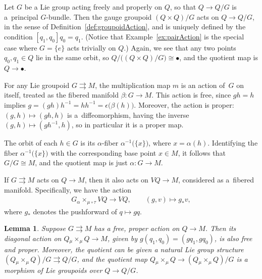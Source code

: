 \documentclass[10pt,a4paper]{amsart}
\numberwithin{equation}{section}
\newtheorem{Lemma}[Theorem]{Lemma}
\begin{document}
\begin{Example} Let $G$ be a Lie group acting freely and properly on $Q$, so that $ Q \rightarrow Q / G $ is a~principal $G$-bundle. Then the gauge groupoid $ ( Q \times Q ) / G $ acts on $ Q \rightarrow Q / G $, in the sense of Def\/inition~\ref{def:groupoidAction}, and is uniquely def\/ined by the condition $ [q _1, q _0 ] q _0 = q _1 $. (Notice that Example~\ref{ex:pairAction} is the special case where $ G = \{ e \} $ acts trivially on $Q$.) Again, we see that any two points $ q _0 , q _1 \in Q $ lie in the same orbit, so $ Q / \bigl( ( Q \times Q ) / G \bigr) \cong \bullet $, and the quotient map is $ Q \rightarrow \bullet $.
\end{Example}

\begin{Example} \label{ex:multiplicationAction} For any Lie groupoid $ G \rightrightarrows M $, the multiplication map $m$ is an action of~$G$ on itself, treated as the f\/ibered manifold $ \beta \colon G \rightarrow M $. This action is free, since $ g h = h $ implies $ g = (g h) h ^{-1} = h h ^{-1} = \epsilon \bigl( \beta (h) \bigr) $. Moreover, the action is proper: $( g , h ) \mapsto ( gh , h ) $ is a~dif\/feomorphism, having the inverse $ ( g, h ) \mapsto ( g h ^{-1} , h ) $, so in particular it is a proper map.

The orbit of each $ h \in G $ is its $\alpha$-f\/iber $ \alpha ^{-1} \bigl( \{ x \} \bigr) $, where $ x = \alpha (h) $. Identifying the f\/iber $ \alpha ^{-1} \bigl( \{ x \} \bigr) $ with the corresponding base point $ x \in M $, it follows that $ G / G \cong M $, and the quotient map is just $ \alpha \colon G \rightarrow M $.
\end{Example}

\begin{Example} If $ G \rightrightarrows M $ acts on $ Q \rightarrow M $, then it also acts on $ V Q \rightarrow M $, considered as a~f\/ibered manifold. Specif\/ically, we have the action
 \begin{gather*}
 G \mathbin{ _\alpha \times _{\mu \circ \tau}} V Q \rightarrow V Q , \qquad ( g , v ) \mapsto g _\ast v ,
 \end{gather*}
 where $ g _\ast $ denotes the pushforward of $ q \mapsto gq $.
\end{Example}

\begin{Lemma} \label{lem:quotientGroupoid}
Suppose $ G \rightrightarrows M $ has a free, proper action on $ Q \rightarrow M $. Then its diagonal action on $ Q \mathbin{ _\mu \times _\mu } Q \rightarrow M $, given by $ g ( q _1 , q _0 ) = ( g q _1 , g q _0 ) $, is also free and proper. Moreover, the quotient can be given a natural Lie group
 structure $ ( Q \mathbin{ _\mu \times _\mu } Q ) / G \rightrightarrows Q / G $, and the quotient map $ Q \mathbin{ _\mu \times _\mu } Q \rightarrow ( Q \mathbin{ _\mu \times _\mu } Q ) / G $ is a morphism of Lie groupoids over $ Q \rightarrow Q / G $.
\end{Lemma}
\end{document}

